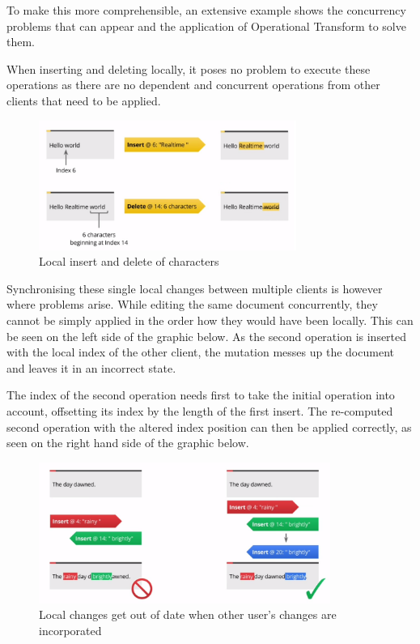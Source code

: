 To make this more comprehensible, an extensive example shows the concurrency problems that can appear and the application of Operational Transform to solve them.

\label{subsubsec:ot-practice}

When inserting and deleting locally, it poses no problem to execute these operations as there are no dependent and concurrent operations from other clients that need to be applied.

\begin{figure}[H] %
	\centering
		\includegraphics[width=0.75\textwidth]{images/ot_local_insert.png}
	\caption{Local insert and delete of characters \cite{website:io2013-drive-api-video}}
\end{figure}

Synchronising these single local changes between multiple clients is however where problems arise. While editing the same document concurrently, they cannot be simply applied in the order how they would have been locally. This can be seen on the left side of the graphic below. As the second operation is inserted with the local index of the other client, the mutation messes up the document and leaves it in an incorrect state.

The index of the second operation needs first to take the initial operation into account, offsetting its index by the length of the first insert. The re-computed second operation with the altered index position can then be applied correctly, as seen on the right hand side of the graphic below.

\begin{figure}[H] %
	\centering
		\includegraphics[width=0.85\textwidth]{images/ot_transform_insert.png}
	\caption{Local changes get out of date when other user's changes are incorporated \cite{website:io2013-drive-api-video}}
\end{figure}

